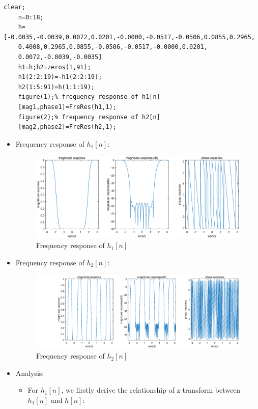 \documentclass[onecolumn,oneside]{SUSTechHomework}
\begin{document}
\begin{lstlisting}[title=\textbf{q6\_3\_1c.m}]
    clear;
    n=0:18;
    h=[-0.0035,-0.0039,0.0072,0.0201,-0.0000,-0.0517,-0.0506,0.0855,0.2965,
    0.4008,0.2965,0.0855,-0.0506,-0.0517,-0.0000,0.0201,
    0.0072,-0.0039,-0.0035]
    h1=h;h2=zeros(1,91);
    h1(2:2:19)=-h1(2:2:19);
    h2(1:5:91)=h(1:1:19);
    figure(1);% frequency response of h1[n]
    [mag1,phase1]=FreRes(h1,1);
    figure(2);% frequency response of h2[n]
    [mag2,phase2]=FreRes(h2,1);
\end{lstlisting}
\begin{itemize}
    \item Frequency response of $h_1[n]$:
    \begin{figure}[H]
        \centering
        \includegraphics[width=170mm]{pictures/h1_FreRes.eps}
        \caption{Frequency response of $h_1[n]$}
    \end{figure}
    \item Frequency response of $h_2[n]$:
    \begin{figure}[H]
        \centering
        \includegraphics[width=170mm]{pictures/h2_FreRes.eps}
        \caption{Frequency response of $h_2[n]$}
    \end{figure}
    \item Analysis:
    \begin{itemize}
        \item For $h_1[n]$, we firstly derive the relationship of z-transform between $h_1[n]$ and $h[n]$:
        $$
        \begin{aligned}

\end{aligned}$$
\end{itemize}
\end{itemize}
\end{document}
